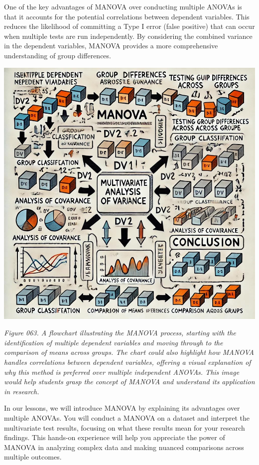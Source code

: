 \documentclass[
]{book}
\begin{document}
One of the key advantages of MANOVA over conducting multiple ANOVAs is that it accounts for the potential correlations between dependent variables. This reduces the likelihood of committing a Type I error (false positive) that can occur when multiple tests are run independently. By considering the combined variance in the dependent variables, MANOVA provides a more comprehensive understanding of group differences.

\includegraphics[width=1\textwidth,height=\textheight]{images/fig063.jpg}

\emph{Figure 063. A flowchart illustrating the MANOVA process, starting with the identification of multiple dependent variables and moving through to the comparison of means across groups. The chart could also highlight how MANOVA handles correlations between dependent variables, offering a visual explanation of why this method is preferred over multiple independent ANOVAs. This image would help students grasp the concept of MANOVA and understand its application in research.}

In our lessons, we will introduce MANOVA by explaining its advantages over multiple ANOVAs. You will conduct a MANOVA on a dataset and interpret the multivariate test results, focusing on what these results mean for your research findings. This hands-on experience will help you appreciate the power of MANOVA in analyzing complex data and making nuanced comparisons across multiple outcomes.
\end{document}

